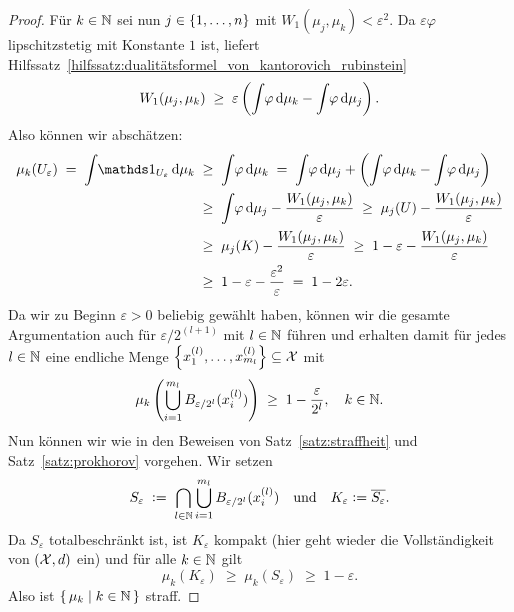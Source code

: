 \documentclass[../thesis/thesis.tex]{subfiles}
\begin{document}
\begin{proof}
		Für  $k \in \mathbb{N}$ sei nun $j \in \left\{1, \dots, n\right\}$ mit $W_1(\mu_j, \mu_k) < \varepsilon^2$. Da $\varepsilon\varphi$ lipschitzstetig mit Konstante $1$ ist, liefert Hilfssatz~\ref{hilfssatz:dualitätsformel_von_kantorovich_rubinstein}
		\[ W_1(\mu_j, \mu_k) \; \geq \; \varepsilon \left( \int_{} \, \varphi \, \mathrm{d}\mu_k - \int_{} \, \varphi \, \mathrm{d}\mu_j \right) \text{.} \]
		Also können wir abschätzen:
		\begin{align*}
			\mu_k(U_\varepsilon) \; = \; \measureint{}{\indfct_{U_\varepsilon}}{\mu_k} \; &\geq \; \measureint{}{\varphi}{\mu_k} \; = \; \measureint{}{\varphi}{\mu_j} + \left( \measureint{}{\varphi}{\mu_k} - \measureint{}{\varphi}{\mu_j} \right) \\
			                                                                              &\geq \; \measureint{}{\varphi}{\mu_j} - \frac{W_1(\mu_j, \mu_k)}{\varepsilon} \; \geq \; \mu_j(U) - \frac{W_1(\mu_j, \mu_k)}{\varepsilon} \\
			                                                                              &\geq \; \mu_j(K) - \frac{W_1(\mu_j, \mu_k)}{\varepsilon} \; \geq \; 1 - \varepsilon - \frac{W_1(\mu_j, \mu_k)}{\varepsilon} \\
			                                                                              &\geq \; 1 - \varepsilon - \frac{\varepsilon^2}{\varepsilon} \; = \; 1 - 2\varepsilon \text{.}
		\end{align*}
		Da wir zu Beginn $\varepsilon > 0$ beliebig gewählt haben, können wir die gesamte Argumentation auch für $\varepsilon/2^{(l+1)}$ mit $l \in \mathbb{N}$ führen und erhalten damit für jedes $l \in \mathbb{N}$ 
		eine endliche Menge $\left\{x_1^{(l)}, \dots, x_{m_l}^{(l)}\right\} \subseteq \mathcal{X}$ mit
		\[ \mu_k \left( \bigcup_{i=1}^{m_l} B_{\varepsilon/2^l}(x_i^{(l)}) \right) \; \geq \; 1 - \frac{\varepsilon}{2^l}, \quad k \in \mathbb{N} \text{.} \]
		Nun können wir wie in den Beweisen von Satz~\ref{satz:straffheit} und Satz~\ref{satz:prokhorov} vorgehen.
		Wir setzen
		\[ S_{\varepsilon} \; \vcentcolon = \; \bigcap_{l \in \mathbb{N}} \bigcup_{i=1}^{m_l} B_{\varepsilon/2^l}(x_i^{(l)}) \quad \text{und} \quad K_{\varepsilon} \vcentcolon = \overline{S_\varepsilon} \text{.} \]
		Da $S_{\varepsilon}$ totalbeschränkt ist, ist $K_{\varepsilon}$ kompakt (hier geht wieder die Vollständigkeit von $(\mathcal{X}, d)$ ein) und für alle $k \in \mathbb{N}$ gilt
		\[ \mu_k(K_{\varepsilon}) \; \geq \; \mu_k(S_{\varepsilon}) \; \geq \; 1 - \varepsilon \text{.} \]
		Also ist $\left\{\, \mu_k \; \middle| \; k \in \mathbb{N} \,\right\}$ straff.
	\end{proof}
\end{document}
